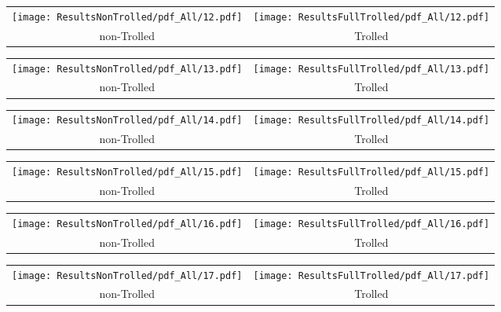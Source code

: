 \begin{tabular}{cc}
{  \texttt{[image: ResultsNonTrolled/pdf\_All/12.pdf]} } & 
{  \texttt{[image: ResultsFullTrolled/pdf\_All/12.pdf]}} \\
 non-Trolled & Trolled \\
\end{tabular}

\begin{tabular}{cc}
{  \texttt{[image: ResultsNonTrolled/pdf\_All/13.pdf]} } & 
{  \texttt{[image: ResultsFullTrolled/pdf\_All/13.pdf]}} \\
 non-Trolled & Trolled \\
\end{tabular}

\begin{tabular}{cc}
{  \texttt{[image: ResultsNonTrolled/pdf\_All/14.pdf]} } & 
{  \texttt{[image: ResultsFullTrolled/pdf\_All/14.pdf]}} \\
 non-Trolled & Trolled \\
\end{tabular}

\begin{tabular}{cc}
{  \texttt{[image: ResultsNonTrolled/pdf\_All/15.pdf]} } & 
{  \texttt{[image: ResultsFullTrolled/pdf\_All/15.pdf]}} \\
 non-Trolled & Trolled \\
\end{tabular}

\begin{tabular}{cc}
{  \texttt{[image: ResultsNonTrolled/pdf\_All/16.pdf]} } & 
{  \texttt{[image: ResultsFullTrolled/pdf\_All/16.pdf]}} \\
 non-Trolled & Trolled \\
\end{tabular}

\begin{tabular}{cc}
{  \texttt{[image: ResultsNonTrolled/pdf\_All/17.pdf]} } & 
{  \texttt{[image: ResultsFullTrolled/pdf\_All/17.pdf]}} \\
 non-Trolled & Trolled \\
\end{tabular}

